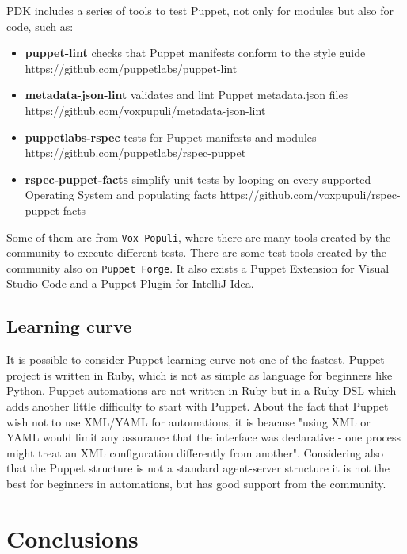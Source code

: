 \documentclass[12pt,a4paper,openright,twoside]{book}
\begin{document}
PDK includes a series of tools to test Puppet, not only for modules but also for code, such as:
\begin{itemize}
    \item \textbf{puppet-lint} checks that Puppet manifests conform to the style guide\newline
    https://github.com/puppetlabs/puppet-lint
    \item \textbf{metadata-json-lint} validates and lint Puppet metadata.json files\newline
    https://github.com/voxpupuli/metadata-json-lint
    \item \textbf{puppetlabs-rspec} tests for Puppet manifests and modules\newline
    https://github.com/puppetlabs/rspec-puppet
    \item \textbf{rspec-puppet-facts} simplify unit tests by looping on every supported Operating System and populating facts\newline
    https://github.com/voxpupuli/rspec-puppet-facts
\end{itemize}
Some of them are from \texttt{Vox Populi}, where there are many tools created by the community to execute different tests.
There are some test tools created by the community also on \texttt{Puppet Forge}.
It also exists a Puppet Extension for Visual Studio Code and a Puppet Plugin for IntelliJ Idea.

\section{Learning curve}
It is possible to consider Puppet learning curve not one of the fastest.
Puppet project is written in Ruby, which is not as simple as language for beginners like Python.
Puppet automations are not written in Ruby but in a Ruby DSL which adds another little difficulty to start with Puppet.
About the fact that Puppet wish not to use XML/YAML for automations, it is beacuse "using XML or YAML would limit any assurance that the interface was declarative - one process might treat an XML configuration differently from another"\cite{puppetDocOldFAQ}.
Considering also that the Puppet structure is not a standard agent-server structure it is not the best for beginners in automations, but has good support from the community.

\chapter{Conclusions}
\end{document}

